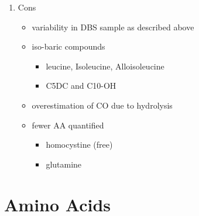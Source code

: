 \documentclass{scrartcl}
\begin{document}
\begin{enumerate}
\begin{enumerate}
\item Cons
\label{sec:org4fab69e}
\begin{itemize}
\item variability in DBS sample as described above
\item iso-baric compounds
\begin{itemize}
\item leucine, Isoleucine, Alloisoleucine
\item C5DC and C10-OH
\end{itemize}
\item overestimation of CO due to hydrolysis
\item fewer AA quantified
\begin{itemize}
\item homocystine (free)
\item glutamine
\end{itemize}
\end{itemize}
\end{enumerate}
\end{enumerate}
\section{Amino Acids}
\label{sec:org140f420}
\end{document}
